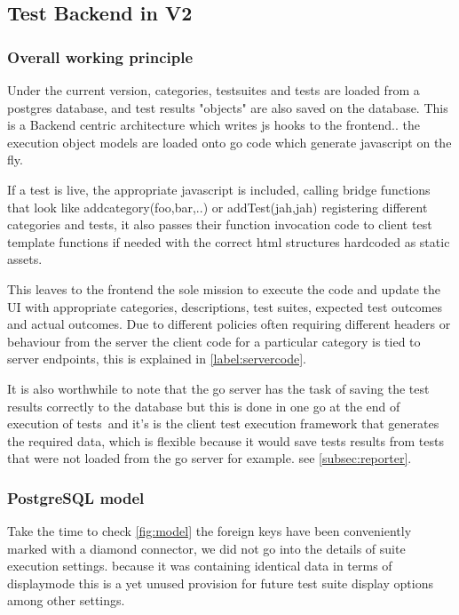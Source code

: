 \subsection{Test Backend in V2}

\subsubsection{Overall working principle}
\label{label:workprinc}

Under the current version, categories, testsuites and tests are loaded from a postgres database, and test results "objects" are also saved on the database.
This is a Backend centric architecture which writes js hooks to the frontend.. the execution object models are loaded onto go code which generate javascript on the fly.

If a test is live, the appropriate javascript is included, calling bridge functions that look like addcategory(foo,bar,..) or addTest(jah,jah) registering different 
categories and tests, it also passes their function invocation code to client test template functions if needed with the correct html structures hardcoded as static assets.

This leaves to the frontend the sole mission to execute the code and update the UI with appropriate categories, descriptions, test suites, expected test outcomes
and actual outcomes. Due to different policies often requiring different headers or behaviour from the server the client code for a particular category is tied to server 
endpoints, this is explained in \ref{label:servercode}.

It is also worthwhile to note that the go server has the task of saving the test results correctly to the database but this is done in one go at the end of execution of tests\
and it's is the client test execution framework that generates the required data, which is 
flexible because it would save tests results from tests that were not loaded from the go server for example. see \ref{subsec:reporter}.

\subsubsection{PostgreSQL model}

Take the time to check \ref{fig:model} the foreign keys have been conveniently marked with a diamond connector, we did not go into the details of suite execution settings.
because it was containing identical data in terms of displaymode this is a yet unused provision for future test suite display options among other settings.

